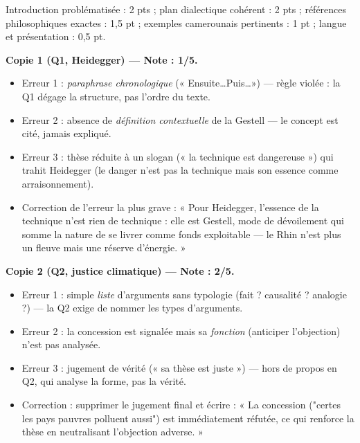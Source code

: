 \documentclass[11pt]{article}
\newcommand{\cle}[1]{{\popxbold\color{popdark}#1}}
\begin{document}
\begin{attention}
Introduction problématisée : 2 pts ; plan dialectique cohérent : 2 pts ; références philosophiques exactes : 1,5 pt ; exemples camerounais pertinents : 1 pt ; langue et présentation : 0,5 pt.
\end{attention}

\begin{corrige}
\textbf{Copie 1 (Q1, Heidegger) — Note : 1/5.}
\begin{itemize}
    \item Erreur 1 : \emph{paraphrase chronologique} (« Ensuite\dots Puis\dots ») — règle violée : la Q1 dégage la structure, pas l'ordre du texte.
    \item Erreur 2 : absence de \emph{définition contextuelle} de la \cle{Gestell} — le concept est cité, jamais expliqué.
    \item Erreur 3 : thèse réduite à un slogan (« la technique est dangereuse ») qui trahit Heidegger (le danger n'est pas la technique mais son essence comme arraisonnement).
    \item Correction de l'erreur la plus grave : « Pour Heidegger, l'essence de la technique n'est rien de technique : elle est \cle{Gestell}, mode de dévoilement qui somme la nature de se livrer comme fonds exploitable — le Rhin n'est plus un fleuve mais une réserve d'énergie. »
\end{itemize}

\textbf{Copie 2 (Q2, justice climatique) — Note : 2/5.}
\begin{itemize}
    \item Erreur 1 : simple \emph{liste} d'arguments sans typologie (fait ? causalité ? analogie ?) — la Q2 exige de nommer les types d'arguments.
    \item Erreur 2 : la concession est signalée mais sa \emph{fonction} (anticiper l'objection) n'est pas analysée.
    \item Erreur 3 : jugement de vérité (« sa thèse est juste ») — hors de propos en Q2, qui analyse la forme, pas la vérité.
    \item Correction : supprimer le jugement final et écrire : « La concession ("certes les pays pauvres polluent aussi") est immédiatement réfutée, ce qui renforce la thèse en neutralisant l'objection adverse. »
\end{itemize}


\end{corrige}
\end{document}
